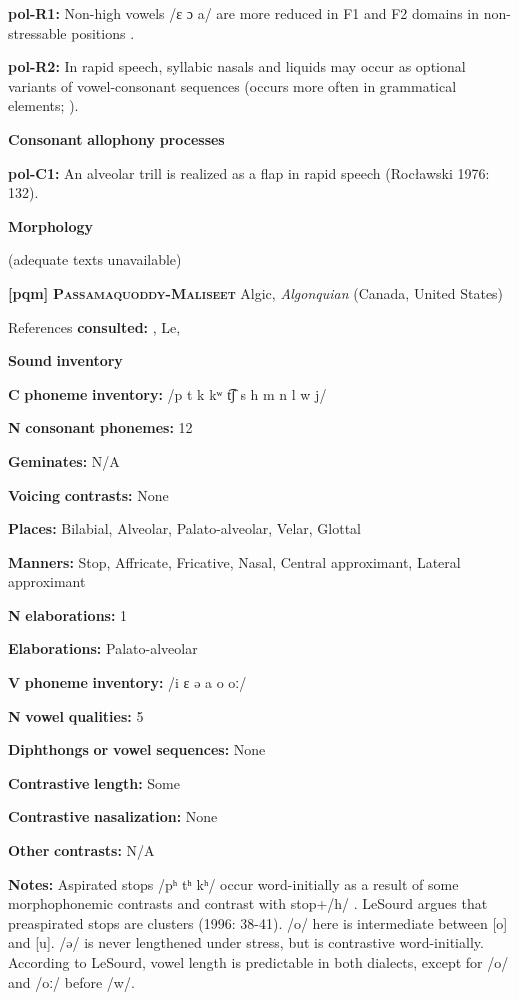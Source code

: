 \begin{styleBody}
\textbf{pol-R1:} Non-high vowels /ɛ ɔ a/ are more reduced in F1 and F2 domains in non-stressable positions \citep[378-9]{Nowak2006}.

\textbf{pol-R2:} In rapid speech, syllabic nasals and liquids may occur as optional variants of vowel-consonant sequences (occurs more often in grammatical elements; \citealt{Rubach1974}).

\textbf{Consonant} \textbf{allophony} \textbf{processes}

\textbf{pol-C1:} An alveolar trill is realized as a flap in rapid speech (Rocławski 1976: 132).

\textbf{Morphology}

(adequate texts unavailable)

\textbf{[pqm]}   \textbf{\textsc{Passamaquoddy-Maliseet}}  Algic, \textit{Algonquian} (Canada, United States)

References \textbf{consulted:} \citet{Leavitt1996}, Le\citet{Sourd1993}, \citet{Sherwood1986}

\textbf{Sound} \textbf{inventory}

\textbf{C} \textbf{phoneme} \textbf{inventory:} /p t k kʷ t͡ʃ s h m n l w j/

\textbf{N} \textbf{consonant} \textbf{phonemes:} 12

\textbf{Geminates:} N/A

\textbf{Voicing} \textbf{contrasts:} None

\textbf{Places:} Bilabial, Alveolar, Palato-alveolar, Velar, Glottal

\textbf{Manners:} Stop, Affricate, Fricative, Nasal, Central approximant, Lateral approximant

\textbf{N} \textbf{elaborations:} 1

\textbf{Elaborations:} Palato-alveolar

\textbf{V} \textbf{phoneme} \textbf{inventory:} /i ɛ ə a o oː/

\textbf{N} \textbf{vowel} \textbf{qualities:} 5

\textbf{Diphthongs} \textbf{or} \textbf{vowel} \textbf{sequences:} None

\textbf{Contrastive} \textbf{length:} Some

\textbf{Contrastive} \textbf{nasalization:} None

\textbf{Other} \textbf{contrasts:} N/A

\textbf{Notes:} Aspirated stops /pʰ tʰ kʰ/ occur word-initially as a result of some morphophonemic contrasts and contrast with stop+/h/ \citep{Sherwood1986}. LeSourd argues that preaspirated stops are clusters (1996: 38-41). /o/ here is intermediate between [o] and [u]. /ə/ is never lengthened under stress, but is contrastive word-initially. According to LeSourd, vowel length is predictable in both dialects, except for /o/ and /oː/ before /w/.


\end{styleBody}
